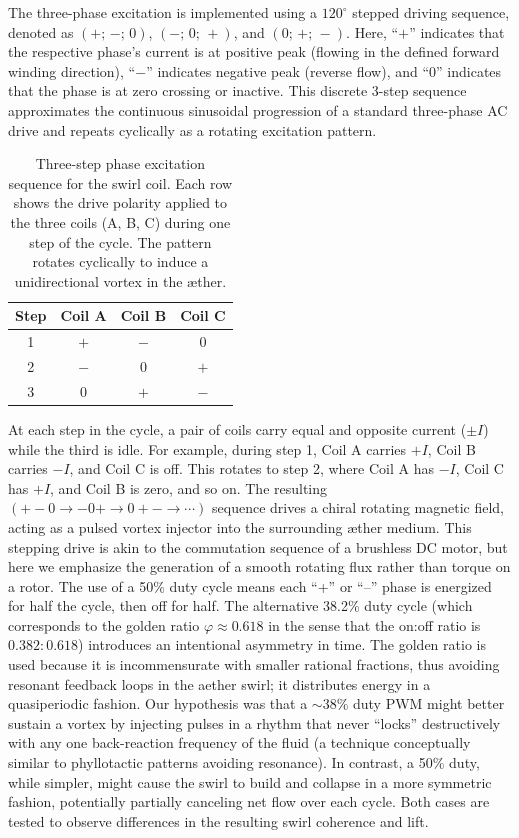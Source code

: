 \documentclass[twocolumn,aps,pre,floatfix,nofootinbib]{revtex4-2}
\begin{document}
The three-phase excitation is implemented using a $120^\circ$ stepped driving sequence, denoted as $(+;\,-;\,0)$, $(-;\,0;\,+)$, and $(0;\,+;\,-)$. Here, “\(+\)” indicates that the respective phase's current is at positive peak (flowing in the defined forward winding direction), “\(-\)” indicates negative peak (reverse flow), and “0” indicates that the phase is at zero crossing or inactive. This discrete 3-step sequence approximates the continuous sinusoidal progression of a standard three-phase AC drive and repeats cyclically as a rotating excitation pattern.

\begin{table}[h]
    \centering
    \begin{tabular}{c|c c c}
        \toprule
        \textbf{Step} & \textbf{Coil A} & \textbf{Coil B} & \textbf{Coil C} \\
        \midrule
        1 & \(+\) & \(-\) & \(0\) \\
        2 & \(-\) & \(0\) & \(+\) \\
        3 & \(0\) & \(+\) & \(-\) \\
        \bottomrule
    \end{tabular}
    \caption{Three-step phase excitation sequence for the swirl coil. Each row shows the drive polarity applied to the three coils (A, B, C) during one step of the cycle. The pattern rotates cyclically to induce a unidirectional vortex in the æther.}
    \label{tab:3-phase-steps}
\end{table}

At each step in the cycle, a pair of coils carry equal and opposite current (\(\pm I\)) while the third is idle. For example, during step 1, Coil A carries \(+I\), Coil B carries \(-I\), and Coil C is off. This rotates to step 2, where Coil A has \(-I\), Coil C has \(+I\), and Coil B is zero, and so on. The resulting $(+\!-\!0 \rightarrow -\!0\!+ \rightarrow 0\!+\!-\rightarrow \cdots)$ sequence drives a chiral rotating magnetic field, acting as a pulsed vortex injector into the surrounding æther medium.
 This stepping drive is akin to the commutation sequence of a brushless DC motor, but here we emphasize the generation of a smooth rotating flux rather than torque on a rotor. The use of a 50\% duty cycle means each “+” or “–” phase is energized for half the cycle, then off for half. The alternative 38.2\% duty cycle (which corresponds to the golden ratio $\varphi \approx 0.618$ in the sense that the on:off ratio is $0.382:0.618$) introduces an intentional asymmetry in time. The golden ratio is used because it is incommensurate with smaller rational fractions, thus avoiding resonant feedback loops in the aether swirl; it distributes energy in a quasiperiodic fashion. Our hypothesis was that a $\sim$38\% duty PWM might better sustain a vortex by injecting pulses in a rhythm that never “locks” destructively with any one back-reaction frequency of the fluid (a technique conceptually similar to phyllotactic patterns avoiding resonance). In contrast, a 50\% duty, while simpler, might cause the swirl to build and collapse in a more symmetric fashion, potentially partially canceling net flow over each cycle. Both cases are tested to observe differences in the resulting swirl coherence and lift.
\end{document}

